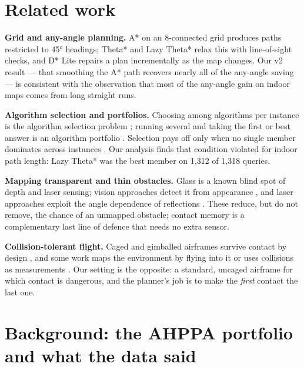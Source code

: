 \documentclass[
]{article}
\begin{document}
\section{Related work}\label{related-work}

\textbf{Grid and any-angle planning.} A* \autocite{hart1968astar} on an
8-connected grid produces paths restricted to 45° headings; Theta*
\autocite{nash2007theta} and Lazy Theta* \autocite{nash2010lazy} relax
this with line-of-sight checks, and D* Lite
\autocite{koenig2002dstarlite} repairs a plan incrementally as the map
changes. Our v2 result --- that smoothing the A* path recovers nearly
all of the any-angle saving --- is consistent with the observation that
most of the any-angle gain on indoor maps comes from long straight runs.

\textbf{Algorithm selection and portfolios.} Choosing among algorithms
per instance is the algorithm selection problem
\autocite{rice1976algorithm}; running several and taking the first or
best answer is an algorithm portfolio \autocite{gomes2001portfolios}.
Selection pays off only when no single member dominates across instances
\autocite{kerschke2019survey}. Our analysis finds that condition
violated for indoor path length: Lazy Theta* was the best member on
1,312 of 1,318 queries.

\textbf{Mapping transparent and thin obstacles.} Glass is a known blind
spot of depth and laser sensing; vision approaches detect it from
appearance \autocite{mei2020glass}, and laser approaches exploit the
angle dependence of reflections \autocite{foster2013glass}. These
reduce, but do not remove, the chance of an unmapped obstacle; contact
memory is a complementary last line of defence that needs no extra
sensor.

\textbf{Collision-tolerant flight.} Caged and gimballed airframes
survive contact by design \autocite{briod2014gimball}, and some work
maps the environment by flying into it \autocite{mulgaonkar2018tiercel}
or uses collisions as measurements \autocite{lew2019contact}. Our
setting is the opposite: a standard, uncaged airframe for which contact
is dangerous, and the planner's job is to make the \emph{first} contact
the last one.

\section{Background: the AHPPA portfolio and what the data
said}\label{background-the-ahppa-portfolio-and-what-the-data-said}
\end{document}
